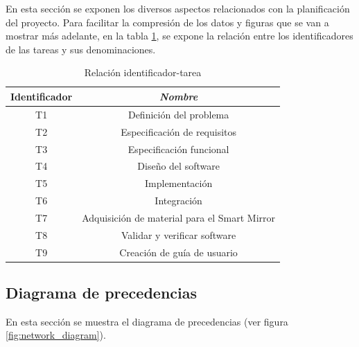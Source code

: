 En esta sección se exponen los diversos aspectos relacionados con la planificación del proyecto. Para facilitar la compresión de los datos y figuras que se van a mostrar más adelante, en la tabla \ref{tab:task_id_name}, se expone la relación entre los identificadores de las tareas y sus denominaciones.

\begin{table}[htp]
	\centering
	\caption{Relación identificador-tarea}\label{tab:task_id_name}
	\begin{tabular}{cc}
		\toprule
    	\textbf{Identificador} & \emph{Nombre}\\
    	\midrule
		T1 & Definición del problema\\
		T2 & Especificación de requisitos\\
		T3 & Especificación funcional\\
		T4 & Diseño del software\\
		T5 & Implementación\\
		T6 & Integración\\
		T7 & Adquisición de material para el Smart Mirror\\
		T8 & Validar y verificar software\\
		T9 & Creación de guía de usuario\\
    	\bottomrule
    \end{tabular}
\end{table}

\subsection{Diagrama de precedencias}

En esta sección se muestra el diagrama de precedencias (ver figura \ref{fig:network_diagram}).

